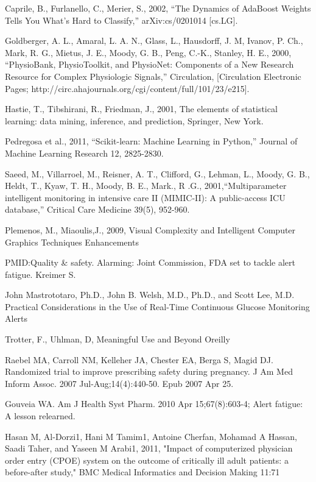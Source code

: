 \documentclass[12pt]{article}
\begin{document}
\begin{thebibliography}{1}

Caprile, B., Furlanello, C., Merier, S., 2002, ``The Dynamics of AdaBoost Weights Tells You What's Hard to Classify,'' arXiv:cs/0201014 [cs.LG].

Goldberger, A. L., Amaral, L. A. N., Glass, L., Hausdorff, J. M, Ivanov, P. Ch., Mark, R. G., Mietus, J. E., Moody, G. B., Peng, C.-K., Stanley, H. E., 2000, ``PhysioBank, PhysioToolkit, and PhysioNet: Components of a New Research Resource for Complex Physiologic Signals,'' Circulation, [Circulation Electronic Pages; http://circ.ahajournals.org/cgi/content/full/101/23/e215].

Hastie, T., Tibshirani, R., Friedman, J., 2001, The elements of statistical learning: data mining, inference, and prediction, Springer, New York.

Pedregosa et al., 2011, ``Scikit-learn: Machine Learning in Python,'' Journal of Machine Learning Research 12, 2825-2830.

Saeed, M., Villarroel, M., Reisner, A. T., Clifford, G., Lehman, L., Moody, G. B., Heldt, T., Kyaw, T. H., Moody, B. E., Mark., R .G., 2001,``Multiparameter intelligent monitoring in intensive care II (MIMIC-II): A public-access ICU database,'' Critical Care Medicine 39(5), 952-960.


Plemenos, M., Miaoulis,J., 2009, Visual Complexity and Intelligent Computer Graphics Techniques Enhancements


PMID:Quality \& safety. Alarming: Joint Commission, FDA set to tackle alert fatigue. Kreimer S.

John Mastrototaro, Ph.D., John B. Welsh, M.D., Ph.D., and Scott Lee, M.D.
Practical Considerations in the Use of Real-Time Continuous Glucose Monitoring Alerts

Trotter, F., Uhlman, D, Meaningful Use and Beyond Oreilly

Raebel MA, Carroll NM, Kelleher JA, Chester EA, Berga S, Magid DJ.
Randomized trial to improve prescribing safety during pregnancy.
J Am Med Inform Assoc. 2007 Jul-Aug;14(4):440-50. Epub 2007 Apr 25.

Gouveia WA. Am J Health Syst Pharm. 2010 Apr 15;67(8):603-4; Alert fatigue: A lesson relearned.

Hasan M, Al-Dorzi1, Hani M Tamim1, Antoine Cherfan, Mohamad A Hassan, Saadi Taher, and Yaseen M Arabi1, 2011, "Impact of computerized physician order entry (CPOE) system on the outcome of critically ill adult patients: a before-after study," BMC Medical Informatics and Decision Making 11:71


\end{thebibliography}
\end{document}
